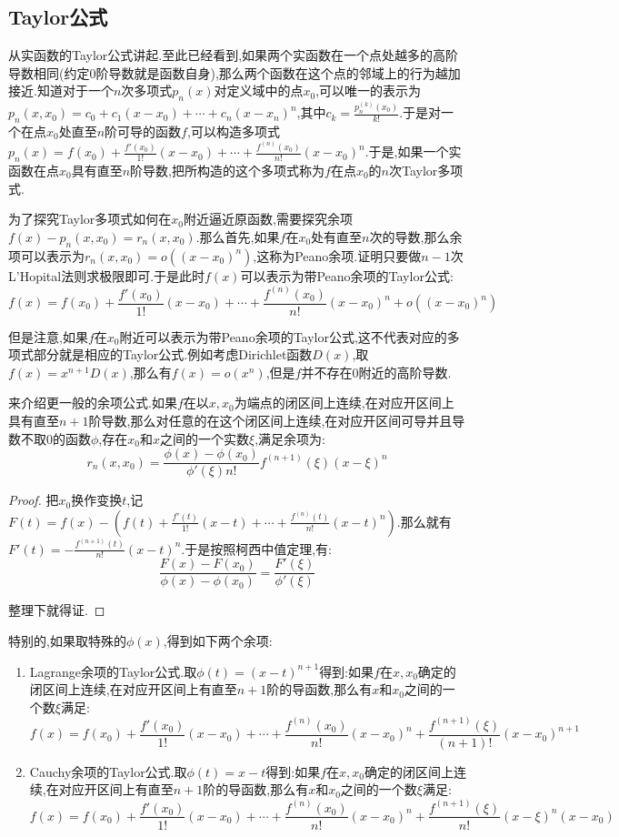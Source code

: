 \subsection{Taylor公式}

从实函数的Taylor公式讲起.至此已经看到,如果两个实函数在一个点处越多的高阶导数相同(约定0阶导数就是函数自身),那么两个函数在这个点的邻域上的行为越加接近.知道对于一个$n$次多项式$p_n(x)$对定义域中的点$x_0$,可以唯一的表示为$p_n(x,x_0)=c_0+c_1(x-x_0)+\cdots+c_n(x-x_n)^n$,其中$c_k=\frac{p_n^{(k)}(x_0)}{k!}$.于是对一个在点$x_0$处直至$n$阶可导的函数$f$,可以构造多项式$p_n(x)=f(x_0)+\frac{f'(x_0)}{1!}(x-x_0)+\cdots+\frac{f^{(n)}(x_0)}{n!}(x-x_0)^n$.于是,如果一个实函数在点$x_0$具有直至$n$阶导数,把所构造的这个多项式称为$f$在点$x_0$的$n$次Taylor多项式.

为了探究Taylor多项式如何在$x_0$附近逼近原函数,需要探究余项$f(x)-p_n(x,x_0)=r_n(x,x_0)$.那么首先,如果$f$在$x_0$处有直至$n$次的导数,那么余项可以表示为$r_n(x,x_0)=o((x-x_0)^n)$,这称为Peano余项.证明只要做$n-1$次L'Hopital法则求极限即可.于是此时$f(x)$可以表示为带Peano余项的Taylor公式:
$$f(x)=f(x_0)+\frac{f'(x_0)}{1!}(x-x_0)+\cdots+\frac{f^{(n)}(x_0)}{n!}(x-x_0)^n+o((x-x_0)^n)$$

但是注意,如果$f$在$x_0$附近可以表示为带Peano余项的Taylor公式,这不代表对应的多项式部分就是相应的Taylor公式.例如考虑Dirichlet函数$D(x)$,取$f(x)=x^{n+1}D(x)$,那么有$f(x)=o(x^n)$,但是$f$并不存在0附近的高阶导数.

来介绍更一般的余项公式.如果$f$在以$x,x_0$为端点的闭区间上连续,在对应开区间上具有直至$n+1$阶导数,那么对任意的在这个闭区间上连续,在对应开区间可导并且导数不取0的函数$\phi$,存在$x_0$和$x$之间的一个实数$\xi$,满足余项为:
$$r_n(x,x_0)=\frac{\phi(x)-\phi(x_0)}{\phi'(\xi)n!}f^{(n+1)}(\xi)(x-\xi)^n$$
\begin{proof}
	
	把$x_0$换作变换$t$,记$F(t)=f(x)-\left(f(t)+\frac{f'(t)}{1!}(x-t)+\cdots+\frac{f^{(n)}(t)}{n!}(x-t)^n\right)$.那么就有$F'(t)=-\frac{f^{(n+1)}(t)}{n!}(x-t)^n$.于是按照柯西中值定理,有:
	$$\frac{F(x)-F(x_0)}{\phi(x)-\phi(x_0)}=\frac{F'(\xi)}{\phi'(\xi)}$$
	
	整理下就得证.
	
\end{proof}

特别的,如果取特殊的$\phi(x)$,得到如下两个余项:
\begin{enumerate}
	\item Lagrange余项的Taylor公式.取$\phi(t)=(x-t)^{n+1}$得到:如果$f$在$x,x_0$确定的闭区间上连续,在对应开区间上有直至$n+1$阶的导函数,那么有$x$和$x_0$之间的一个数$\xi$满足:
	$$f(x)=f(x_0)+\frac{f'(x_0)}{1!}(x-x_0)+\cdots+\frac{f^{(n)}(x_0)}{n!}(x-x_0)^n+\frac{f^{(n+1)}(\xi)}{(n+1)!}(x-x_0)^{n+1}$$
	\item Cauchy余项的Taylor公式.取$\phi(t)=x-t$得到:如果$f$在$x,x_0$确定的闭区间上连续,在对应开区间上有直至$n+1$阶的导函数,那么有$x$和$x_0$之间的一个数$\xi$满足:
	$$f(x)=f(x_0)+\frac{f'(x_0)}{1!}(x-x_0)+\cdots+\frac{f^{(n)}(x_0)}{n!}(x-x_0)^n+\frac{f^{(n+1)}(\xi)}{n!}(x-\xi)^n(x-x_0)$$
\end{enumerate}

